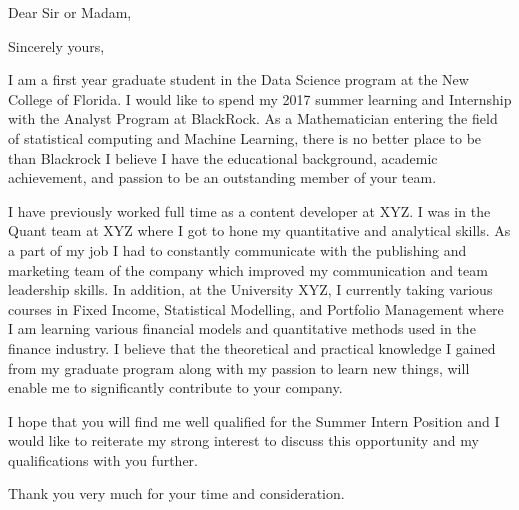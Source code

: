 \documentclass[11pt,a4paper,sans]{moderncv} %
\begin{document}


\date{\today} %
\opening{Dear Sir or Madam,} %
\closing{Sincerely yours,} %

\makelettertitle %

I am a first year graduate student in the Data Science program at the New College of Florida. I would like to spend my 2017 summer learning and  Internship with the Analyst Program at BlackRock. As a Mathematician entering the field of statistical computing and Machine Learning, there is no better place to be than Blackrock I believe I have the educational background, academic achievement, and passion to be an outstanding member of your team.

I have previously worked full time as a content developer at XYZ. I was in the Quant team at XYZ where I got to hone my quantitative and analytical skills. As a part of my job I had to constantly communicate with the publishing and marketing team of the company which improved my communication and team leadership skills. In addition, at the University XYZ, I currently taking various courses in Fixed Income, Statistical Modelling, and Portfolio Management where I am learning various financial models and quantitative methods used in the finance industry. I believe that the theoretical and practical knowledge I gained from my graduate program along with my passion to learn new things, will enable me to significantly contribute to your company.

I hope that you will find me well qualified for the Summer Intern Position and I would like to reiterate my strong interest to discuss this opportunity and my qualifications with you further.

Thank you very much for your time and consideration.

\makeletterclosing %

\clearpage

\end{document}
